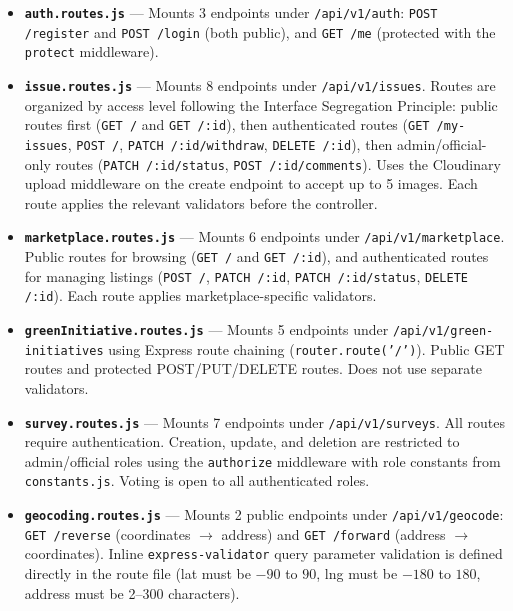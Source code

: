 \documentclass[12pt,a4paper]{article}
\begin{document}
\begin{itemize}[leftmargin=1cm]
  \item \textbf{\texttt{auth.routes.js}} --- Mounts 3 endpoints under \texttt{/api/v1/auth}: \texttt{POST /register} and \texttt{POST /login} (both public), and \texttt{GET /me} (protected with the \texttt{protect} middleware).

  \item \textbf{\texttt{issue.routes.js}} --- Mounts 8 endpoints under \texttt{/api/v1/issues}. Routes are organized by access level following the Interface Segregation Principle: public routes first (\texttt{GET /} and \texttt{GET /:id}), then authenticated routes (\texttt{GET /my-issues}, \texttt{POST /}, \texttt{PATCH /:id/withdraw}, \texttt{DELETE /:id}), then admin/official-only routes (\texttt{PATCH /:id/status}, \texttt{POST /:id/comments}). Uses the Cloudinary upload middleware on the create endpoint to accept up to 5 images. Each route applies the relevant validators before the controller.

  \item \textbf{\texttt{marketplace.routes.js}} --- Mounts 6 endpoints under \texttt{/api/v1/marketplace}. Public routes for browsing (\texttt{GET /} and \texttt{GET /:id}), and authenticated routes for managing listings (\texttt{POST /}, \texttt{PATCH /:id}, \texttt{PATCH /:id/status}, \texttt{DELETE /:id}). Each route applies marketplace-specific validators.

  \item \textbf{\texttt{greenInitiative.routes.js}} --- Mounts 5 endpoints under \texttt{/api/v1/green-initiatives} using Express route chaining (\texttt{router.route('/')}). Public GET routes and protected POST/PUT/DELETE routes. Does not use separate validators.

  \item \textbf{\texttt{survey.routes.js}} --- Mounts 7 endpoints under \texttt{/api/v1/surveys}. All routes require authentication. Creation, update, and deletion are restricted to admin/official roles using the \texttt{authorize} middleware with role constants from \texttt{constants.js}. Voting is open to all authenticated roles.

  \item \textbf{\texttt{geocoding.routes.js}} --- Mounts 2 public endpoints under \texttt{/api/v1/geocode}: \texttt{GET /reverse} (coordinates $\rightarrow$ address) and \texttt{GET /forward} (address $\rightarrow$ coordinates). Inline \texttt{express-validator} query parameter validation is defined directly in the route file (lat must be $-90$ to $90$, lng must be $-180$ to $180$, address must be 2--300 characters).
\end{itemize}
\end{document}
